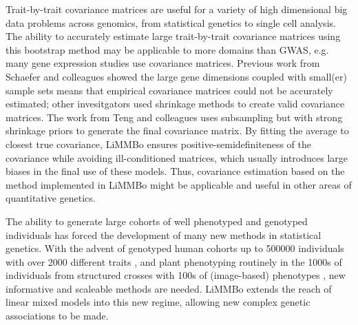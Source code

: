 Trait-by-trait covariance matrices are useful for a variety of high dimensional big data problems across genomics, from statistical genetics to single cell analysis. The ability to accurately estimate large trait-by-trait covariance matrices using this bootstrap method may be applicable to more domains than GWAS, e.g. many gene expression studies use covariance matrices. Previous work from Schaefer and colleagues \cite{Schafer2005} showed the large gene dimensions coupled with small(er) sample sets means that empirical covariance matrices could not be accurately estimated; other invesitgators \cite{Ledoit2004,Furrer2007,Bickel2008} used shrinkage methods to create valid covariance matrices. The work from Teng and colleagues \cite{Teng2009} uses subsampling but with strong shrinkage priors to generate the final covariance matrix. By fitting the average to closest true covariance, LiMMBo ensures positive-semidefiniteness of the covariance while avoiding ill-conditioned matrices, which usually introduces large biases in the final use of these models. Thus, covariance estimation based on the method implemented in LiMMBo might be applicable and useful in other areas of quantitative genetics.  

The ability to generate large cohorts of well phenotyped and genotyped individuals has forced the development of many new methods in statistical genetics. With the advent of genotyped human cohorts up to \num{500000} individuals with over \num{2000} different traits \citep{Sudlow2015}, and plant phenotyping routinely in the \num{1000}s of individuals from structured crosses with \num{100}s of (image-based) phenotypes \citep{Atwell2010} , new informative and scaleable methods are needed. LiMMBo extends the reach of linear mixed models into this new regime, allowing new complex genetic associations to be made.
